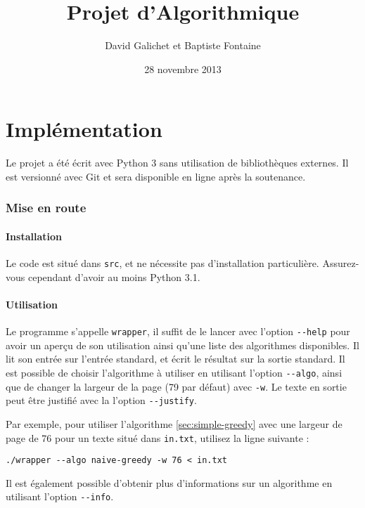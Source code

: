 \documentclass[a4paper, 11pt]{article}
\begin{document}
\title{Projet d'Algorithmique}
\author{David Galichet et Baptiste Fontaine}
\date{28 novembre 2013}
\maketitle
\tableofcontents
\newpage


\part{Implémentation}

Le projet a été écrit avec Python 3 sans utilisation de bibliothèques externes.
Il est versionné avec Git et sera disponible en ligne après la soutenance.

\section{Mise en route}
\subsection{Installation}

Le code est situé dans \verb|src|, et ne nécessite pas d'installation
particulière. Assurez-vous cependant d'avoir au moins Python 3.1.

\subsection{Utilisation}

Le programme s'appelle \verb|wrapper|, il suffit de le lancer avec l'option
\verb|--help| pour avoir un aperçu de son utilisation ainsi qu'une liste des
algorithmes disponibles. Il lit son entrée sur l'entrée standard, et écrit le
résultat sur la sortie standard. Il est possible de choisir l'algorithme à
utiliser en utilisant l'option \verb|--algo|, ainsi que de changer la largeur
de la page (79 par défaut) avec \verb|-w|. Le texte en sortie peut être
justifié avec la l'option \verb|--justify|.

Par exemple, pour utiliser l'algorithme \ref{sec:simple-greedy} avec une largeur
de page de 76 pour un texte situé dans \verb|in.txt|, utilisez la ligne suivante
:

\begin{verbatim}
./wrapper --algo naive-greedy -w 76 < in.txt
\end{verbatim}

Il est également possible d'obtenir plus d'informations sur un algorithme en
utilisant l'option \verb|--info|.
\end{document}
